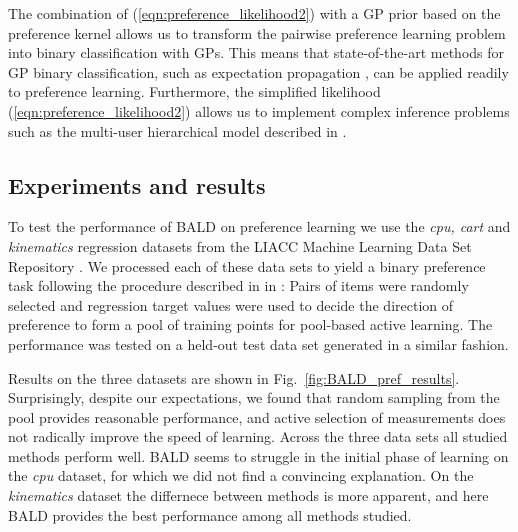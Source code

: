 The combination of (\ref{eqn:preference_likelihood2}) with a GP prior based on the preference kernel allows us to transform the pairwise preference learning problem into  binary classification with GPs. This means that state-of-the-art methods for GP binary classification, such as expectation propagation \citep{Minka2001}, can be applied readily to preference learning. Furthermore, the simplified likelihood (\ref{eqn:preference_likelihood2}) allows us to implement complex inference problems such as the multi-user hierarchical model described in \citep{Houlsby2012preference}.

\subsection{Experiments and results}

To test the performance of BALD on preference learning we use the \emph{cpu, cart} and \emph{kinematics} regression datasets from the LIACC Machine Learning Data Set Repository \citep{LIACCRepository}. We processed each of these data sets to yield a binary preference task following the procedure described in in \cite{Chu2005}: Pairs of items were randomly selected and regression target values were used to decide the direction of preference to form a pool of training points for pool-based active learning. The performance was tested on a held-out test data set generated in a similar fashion.

Results on the three datasets are shown in Fig.\ \ref{fig:BALD_pref_results}.  Surprisingly, despite our expectations, we found that random sampling from the pool provides reasonable performance, and active selection of measurements does not radically improve the speed of learning. Across the three data sets all studied methods perform well. BALD seems to struggle in the initial phase of learning on the \emph{cpu} dataset, for which we did not find a convincing explanation. On the \emph{kinematics} dataset the differnece between methods is more apparent, and here BALD provides the best performance among all methods studied.

